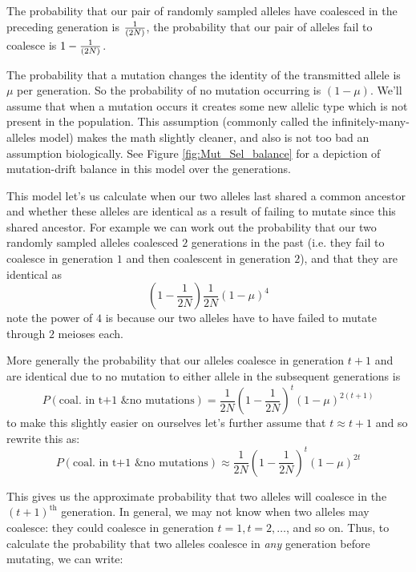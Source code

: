 The probability that our pair of randomly sampled alleles have coalesced in the
preceding generation is $\nicefrac{1}{(2N)}$, the probability that our pair of
alleles fail to coalesce is $1-\nicefrac{1}{(2N)}$. 

The probability that a mutation changes the identity of the
transmitted allele is $\mu$ per generation. So the probability of no
mutation occurring is $(1-\mu)$. We'll assume that when a mutation
occurs it creates some new allelic type which is not present in the
population. This assumption (commonly called the infinitely-many-alleles model) makes the math slightly cleaner, and also
is not too bad an assumption biologically. See Figure
\ref{fig:Mut_Sel_balance} for a depiction of mutation-drift balance in
this model over the generations.

This model let's us calculate when our two alleles last shared a common
ancestor and whether these alleles are identical as a result of
failing to mutate since this shared ancestor.  For example we can work out the probability that our
two randomly sampled alleles coalesced $2$ generations in the past
(i.e. they fail to coalesce in generation $1$ and then coalescent in
generation $2$), and
that they are identical as
\begin{equation}
\left(1- \frac{1}{2N} \right) \frac{1}{2N} (1-\mu)^4
\end{equation}
note the power of $4$ is because our two alleles have to have failed
to mutate through $2$ meioses each. 

More generally the probability that our alleles coalesce in generation
$t+1$ and are identical due to no mutation to either allele in the
subsequent generations is
%
\begin{equation}
P(\textrm{coal. in t+1 \& no mutations}) =  \frac{1}{2N} \left(1- \frac{1}{2N} \right)^t \left(1-\mu \right)^{2(t+1)}
\end{equation}
%
to make this slightly easier on ourselves let's further assume that $t
\approx t+1$ and so rewrite this as:
\begin{equation}
P(\textrm{coal. in t+1 \& no mutations}) \approx \frac{1}{2N} \left(1- \frac{1}{2N} \right)^t \left(1-\mu \right)^{2t}
\end{equation}
%

This gives us the approximate probability that two alleles will coalesce in the
$(t+1)^\text{th}$ generation. In general, we may not know when two alleles may
coalesce: they could coalesce in generation $t=1, t=2, \ldots $, and so on.
Thus, to calculate the probability that two alleles coalesce in \emph{any}
generation before mutating, we can write:

